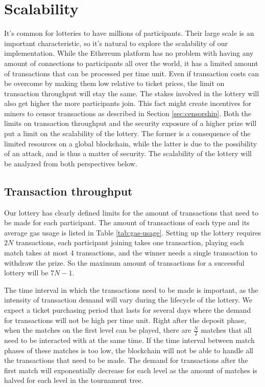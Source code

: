 \section{Scalability}
\label{sec:scalability}

It's common for lotteries to have millions of participants. Their large scale is an important characteristic, so it's natural to explore the scalability of our implementation. While the Ethereum platform has no problem with having any amount of connections to participants all over the world, it has a limited amount of transactions that can be processed per time unit. Even if transaction costs can be overcome by making them low relative to ticket prices, the limit on transaction throughput will stay the same. The stakes involved in the lottery will also get higher the more participants join. This fact might create incentives for miners to censor transactions as described in Section \ref{sec:censorship}. 
Both the limits on transaction throughput and the security exposure of a higher prize will put a limit on the scalability of the lottery. The former is a consequence of the limited resources on a global blockchain, while the latter is due to the possibility of an attack, and is thus a matter of security. The scalability of the lottery will be analyzed from both perspectives below.

\subsection{Transaction throughput}

Our lottery has clearly defined limits for the amount of transactions that need to be made for each participant. The amount of transactions of each type and its average gas usage is listed in Table \ref{tab:gas-usage}. Setting up the lottery requires $2N$ transactions, each participant joining takes one transaction, playing each match takes at most $4$ transactions, and the winner needs a single transaction to withdraw the prize. So the maximum amount of transactions for a successful lottery will be $7N-1$.  

The time interval in which the transactions need to be made is important, as the intensity of transaction demand will vary during the lifecycle of the lottery. We expect a ticket purchasing period that lasts for several days where the demand for transactions will not be high per time unit. Right after the deposit phase, when the matches on the first level can be played, there are $\frac{N}{2}$ matches that all need to be interacted with at the same time. If the time interval between match phases of these matches is too low, the blockchain will not be able to handle all the transactions that need to be made. The demand for transactions after the first match will exponentially decrease for each level as the amount of matches is halved for each level in the tournament tree.


